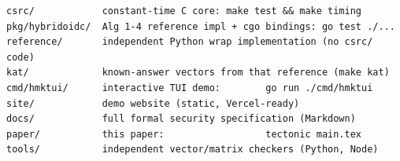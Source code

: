 \begin{lstlisting}[caption={Repository layout and commands},label={repo}]
csrc/            constant-time C core: make test && make timing
pkg/hybridoidc/  Alg 1-4 reference impl + cgo bindings: go test ./...
reference/       independent Python wrap implementation (no csrc/ code)
kat/             known-answer vectors from that reference (make kat)
cmd/hmktui/      interactive TUI demo:        go run ./cmd/hmktui
site/            demo website (static, Vercel-ready)
docs/            full formal security specification (Markdown)
paper/           this paper:                  tectonic main.tex
tools/           independent vector/matrix checkers (Python, Node)
\end{lstlisting}
